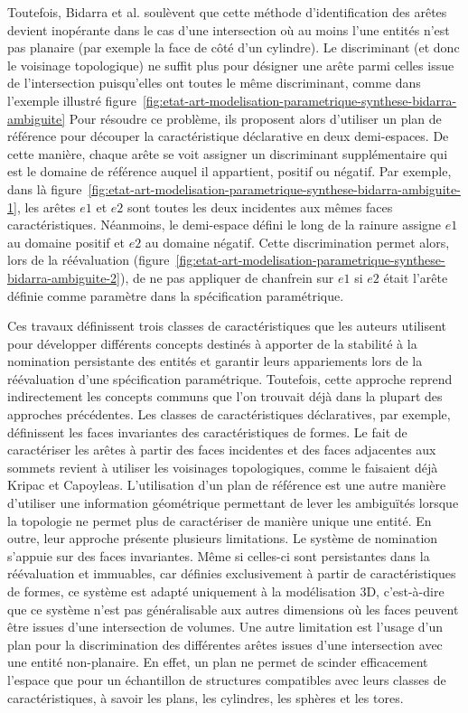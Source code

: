 Toutefois, Bidarra et al. soulèvent que cette méthode d'identification des
arêtes devient inopérante dans le cas d'une intersection où au moins l'une
entités n'est pas planaire (par exemple la face de côté d'un cylindre). %
Le discriminant (et donc le voisinage topologique) ne suffit plus pour désigner
une arête parmi celles issue de l'intersection puisqu'elles ont toutes le même
discriminant, comme dans l'exemple illustré
figure~\ref{fig:etat-art-modelisation-parametrique-synthese-bidarra-ambiguite} %
Pour résoudre ce problème, ils proposent alors d'utiliser un plan de référence
pour découper la caractéristique déclarative en deux demi-espaces. %
De cette manière, chaque arête se voit assigner un discriminant supplémentaire
qui est le domaine de référence auquel il appartient, positif ou négatif. %
Par exemple, dans là
figure~\ref{fig:etat-art-modelisation-parametrique-synthese-bidarra-ambiguite-1}, les arêtes
\(e1\) et \(e2\) sont toutes les deux incidentes aux mêmes faces
caractéristiques. %
Néanmoins, le demi-espace défini le long de la rainure assigne \(e1\) au domaine
positif et \(e2\) au domaine négatif. %
Cette discrimination permet alors, lors de la réévaluation
(figure~\ref{fig:etat-art-modelisation-parametrique-synthese-bidarra-ambiguite-2}), de ne pas
appliquer de chanfrein sur \(e1\) si \(e2\) était l'arête définie comme
paramètre dans la spécification paramétrique. %

Ces travaux définissent trois classes de caractéristiques que les auteurs
utilisent pour développer différents concepts destinés à apporter de la
stabilité à la nomination persistante des entités et garantir leurs appariements
lors de la réévaluation d'une spécification paramétrique. %
Toutefois, cette approche reprend indirectement les concepts communs que l'on
trouvait déjà dans la plupart des approches précédentes. %
Les classes de caractéristiques déclaratives, par exemple, définissent les faces
invariantes des caractéristiques de formes. %
Le fait de caractériser les arêtes à partir des faces incidentes et des faces
adjacentes aux sommets revient à utiliser les voisinages topologiques, comme le
faisaient déjà Kripac et Capoyleas. %
L'utilisation d'un plan de référence est une autre manière d'utiliser une
information géométrique permettant de lever les ambiguïtés lorsque la topologie
ne permet plus de caractériser de manière unique une entité. %
En outre, leur approche présente plusieurs limitations. %
Le système de nomination s'appuie sur des faces invariantes. %
Même si celles-ci sont persistantes dans la réévaluation et immuables, car
définies exclusivement à partir de caractéristiques de formes, ce système est
adapté uniquement à la modélisation 3D, c'est-à-dire que ce système n'est pas
généralisable aux autres dimensions où les faces peuvent être issues d'une
intersection de volumes. %
Une autre limitation est l'usage d'un plan pour la discrimination des
différentes arêtes issues d'une intersection avec une entité non-planaire. %
En effet, un plan ne permet de scinder efficacement l'espace que pour un
échantillon de structures compatibles avec leurs classes de caractéristiques, à
savoir les plans, les cylindres, les sphères et les tores. %


